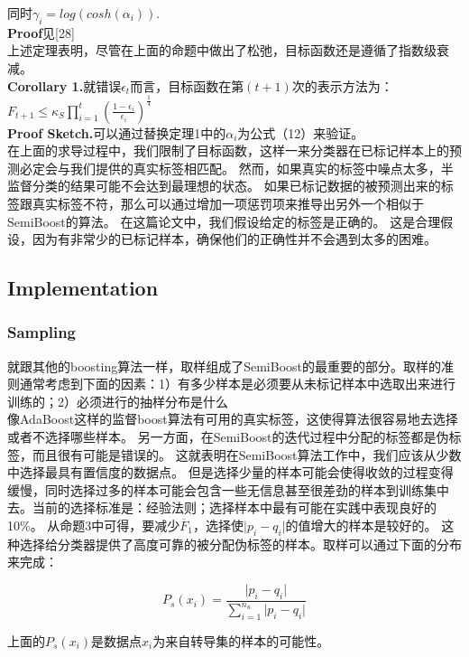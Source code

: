 \documentclass[10pt,journal,compsoc]{IEEEtran}
\begin{document}
同时$\gamma_i=log(cosh(\alpha_i))$.\\
\textbf{Proof}见[28]\\
上述定理表明，尽管在上面的命题中做出了松弛，目标函数还是遵循了指数级衰减。\\

\textbf{Corollary 1.}就错误$\epsilon_t$而言，目标函数在第$(t+1)$次的表示方法为：
$F_{t+1} \leq \kappa_S \prod\nolimits^t_{i=1}(\frac{1-\epsilon_i}{\epsilon_i})^{\frac{1}{4}}$\\
\textbf{Proof Sketch.}可以通过替换定理1中的$\alpha_i$为公式（12）来验证。 \\

在上面的求导过程中，我们限制了目标函数，这样一来分类器在已标记样本上的预测必定会与我们提供的真实标签相匹配。
然而，如果真实的标签中噪点太多，半监督分类的结果可能不会达到最理想的状态。
如果已标记数据的被预测出来的标签跟真实标签不符，那么可以通过增加一项惩罚项来推导出另外一个相似于SemiBoost的算法。
在这篇论文中，我们假设给定的标签是正确的。
这是合理假设，因为有非常少的已标记样本，确保他们的正确性并不会遇到太多的困难。

\subsection{Implementation}
\subsubsection{Sampling}
就跟其他的boosting算法一样，取样组成了SemiBoost的最重要的部分。取样的准则通常考虑到下面的因素：1）有多少样本是必须要从未标记样本中选取出来进行训练的；2）必须进行的抽样分布是什么\\

像AdaBoost这样的监督boost算法有可用的真实标签，这使得算法很容易地去选择或者不选择哪些样本。
另一方面，在SemiBoost的迭代过程中分配的标签都是伪标签，而且很有可能是错误的。
这就表明在SemiBoost算法工作中，我们应该从少数中选择最具有置信度的数据点。
但是选择少量的样本可能会使得收敛的过程变得缓慢，同时选择过多的样本可能会包含一些无信息甚至很差劲的样本到训练集中去。当前的选择标准是：经验法则；选择样本中最有可能在实践中表现良好的10\%。
从命题3中可得，要减少$\overline{F}_1$，选择使$\vert p_i-q_i \vert$的值增大的样本是较好的。
这种选择给分类器提供了高度可靠的被分配伪标签的样本。取样可以通过下面的分布来完成：
\begin{center}
\begin{equation*}
P_s(x_i)=\frac{\vert p_i - q_i \vert}{\sum\nolimits^{n_u}_{i=1}\vert p_i - q_i \vert}
\end{equation*}
\end{center}
上面的$P_s(x_i)$是数据点$x_i$为来自转导集的样本的可能性。
\end{document}
